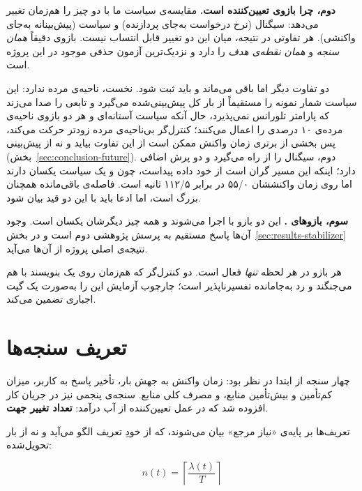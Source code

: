 \textbf{دوم، چرا  بازوی تعیین‌کننده است.} مقایسه‌ی سیاست ما با 
دو چیز را هم‌زمان تغییر می‌دهد: سیگنال (نرخ درخواست به‌جای پردازنده) و سیاست (پیش‌بینانه
به‌جای واکنشی). هر تفاوتی در نتیجه، میان این دو تغییر قابل انتساب نیست. بازوی 
دقیقاً \emph{همان سنجه} و \emph{همان نقطه‌ی هدف} را دارد و نزدیک‌ترین آزمون حذفی موجود در
این پروژه است.

دو تفاوت دیگر اما باقی می‌ماند و باید ثبت شود. نخست،  ناحیه‌ی مرده
ندارد: این سیاست شمار نمونه را مستقیماً از بار کل پیش‌بینی‌شده می‌گیرد و تابعی را صدا
می‌زند که پارامتر تلورانس نمی‌پذیرد، حال آنکه سیاست آستانه‌ای و هر دو بازوی 
ناحیه‌ی مرده‌ی ۱۰ درصدی را اعمال می‌کنند؛ کنترل‌گر بی‌ناحیه‌ی مرده زودتر حرکت می‌کند، پس
بخشی از برتری زمان واکنش ممکن است از این تفاوت بیاید و نه از پیش‌بینی
(بخش~\ref{sec:conclusion-future}). دوم،  سیگنال را از راه
 می‌گیرد و دو پرش اضافی دارد؛ اینکه این مسیر گران است از خود داده
پیداست، چون  و  یک سیاست یکسان دارند اما روی 
زمان واکنششان ۵۵/۰ در برابر ۱۱۲/۵ ثانیه است. فاصله‌ی باقی‌مانده همچنان بزرگ است، اما ادعا
باید با این دو قید بیان شود.

\textbf{سوم، بازوهای .} این دو بازو با 
اجرا می‌شوند و همه چیز دیگرشان یکسان است. وجود آن‌ها پاسخ مستقیم به پرسش پژوهشی دوم است و در
بخش~\ref{sec:results-stabilizer} نتیجه‌ی اصلی پروژه از آن‌ها می‌آید.

هر بازو در هر لحظه \emph{تنها} فعال است. دو کنترل‌گر که هم‌زمان روی یک 
بنویسند با هم می‌جنگند و رد به‌جامانده تفسیرناپذیر است؛ چارچوب آزمایش این را به‌صورت یک گیت
اجباری تضمین می‌کند.

\section{تعریف سنجه‌ها}
\label{sec:method-metrics}

چهار سنجه از ابتدا در نظر بود: زمان واکنش به جهش بار، تأخیر پاسخ به کاربر، میزان
کم‌تأمین و بیش‌تأمین منابع، و مصرف کلی منابع. سنجه‌ی پنجمی نیز در جریان کار افزوده شد که
در عمل تعیین‌کننده از آب درآمد: \textbf{تعداد تغییر جهت}.

تعریف‌ها بر پایه‌ی «نیاز مرجع» بیان می‌شوند، که از خودِ تعریف الگو می‌آید و نه از بار
تحویل‌شده:

\begin{equation}
\label{eq:needed}
n(t) = \left\lceil \frac{\lambda(t)}{T} \right\rceil
\end{equation}


